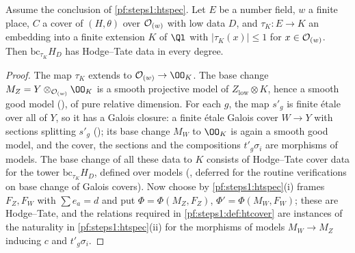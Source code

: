\begin{lemma}\label{pf:steps1:coverlow}
Assume the conclusion of \cref{pf:steps1:htspec}. Let $E$ be a number field, $w$ a finite place, $C$ a cover of
$(H,\theta)$ over $\mathcal{O}_{(w)}$ with low data $D$, and $\tau_K\colon E\to K$ an embedding into a finite extension $K$ of $\Ql$
with $|\tau_K(x)|\le1$ for $x\in\mathcal{O}_{(w)}$. Then $\mathrm{bc}_{\tau_K}H_D$ has Hodge--Tate data in every degree.
\end{lemma}

\begin{proof}
The map $\tau_K$ extends to $\stepsIOw\to\OO_K$. The base change $M_Z=Y\otimes_{\stepsIOw}\OO_K$ is a smooth projective model of
$Z_{\mathrm{low}}\otimes K$, hence a smooth good model (), of pure relative dimension.
For each $g$, the map $s'_g$ is finite \'etale over all of $Y$, so it has a Galois closure: a finite \'etale Galois cover
$W\to Y$ with sections splitting $s'_g$ (); its base change $M_W$ to $\OO_K$ is again
a smooth good model, and the cover, the sections and the compositions $t'_g\sigma_i$ are morphisms of models. The base change
of all these data to $K$ consists of Hodge--Tate cover data for the tower $\mathrm{bc}_{\tau_K}H_D$, defined over models
(, deferred for the routine verifications on base change of Galois covers). Now choose by
\cref{pf:steps1:htspec}(i) frames $F_Z,F_W$ with $\sum e_a=d$ and put $\Phi=\Phi(M_Z,F_Z)$, $\Phi'=\Phi(M_W,F_W)$; these are
Hodge--Tate, and the relations required in \cref{pf:steps1:def:htcover} are instances of the naturality in
\cref{pf:steps1:htspec}(ii) for the morphisms of models $M_W\to M_Z$ inducing $c$ and $t'_g\sigma_i$.
\end{proof}

